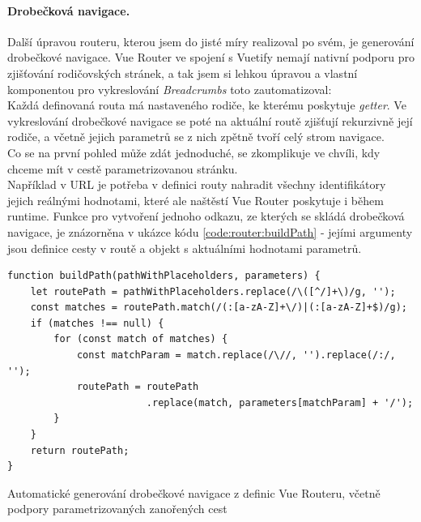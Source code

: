 \paragraph{Drobečková navigace.} Další úpravou routeru, kterou jsem do jisté míry realizoval po svém, je generování drobečkové navigace. Vue Router ve spojení s Vuetify nemají nativní podporu pro zjišťování rodičovských stránek, a tak jsem si lehkou úpravou a vlastní komponentou pro vykreslování \emph{Breadcrumbs} toto zautomatizoval:\\
Každá definovaná routa má nastaveného rodiče, ke kterému poskytuje \emph{getter}. Ve vykreslování drobečkové navigace se poté na aktuální routě zjišťují rekurzivně její rodiče, a včetně jejich parametrů se z nich zpětně tvoří celý strom navigace.\\
Co se na první pohled může zdát jednoduché, se zkomplikuje ve chvíli, kdy chceme mít v cestě parametrizovanou stránku.\\
Například v URL  je potřeba v definici routy nahradit všechny identifikátory jejich reálnými hodnotami, které ale naštěstí Vue Router poskytuje i během runtime. Funkce pro vytvoření jednoho odkazu, ze kterých se skládá drobečková navigace, je znázorněna v ukázce kódu \ref{code:router:buildPath} - jejími argumenty jsou definice cesty v routě a objekt s aktuálními hodnotami parametrů.

\begin{listing}[H]
    \begin{verbatim}
function buildPath(pathWithPlaceholders, parameters) {
    let routePath = pathWithPlaceholders.replace(/\([^/]+\)/g, '');
    const matches = routePath.match(/(:[a-zA-Z]+\/)|(:[a-zA-Z]+$)/g);
    if (matches !== null) {
        for (const match of matches) {
            const matchParam = match.replace(/\//, '').replace(/:/, '');
            routePath = routePath
                        .replace(match, parameters[matchParam] + '/');
        }
    }
    return routePath;
}
\end{verbatim}
\caption[Automatické generování drobečkové navigace]{Automatické generování drobečkové navigace z definic Vue Routeru, včetně podpory parametrizovaných zanořených cest} \label{code:router:buildPath}
\end{listing}



